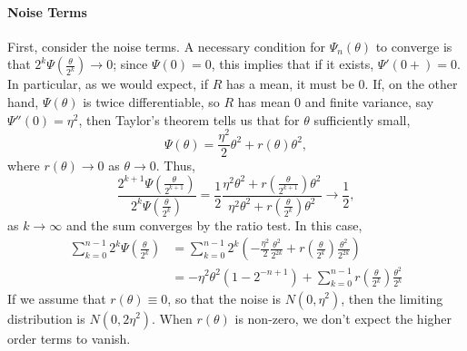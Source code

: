 \documentclass{article}
\newcommand{\1}{\mathbbm{1}}
\theoremstyle{remark}
\theoremstyle{definition}
\begin{document}
\paragraph{Noise Terms}
First, consider the noise terms.  A necessary condition for $\Psi_{n}(\theta)$ to converge is that $2^{k} \Psi\left(\frac{\theta}{2^{k}}\right) \to 0$; since $\Psi(0) = 0$, this implies that if it exists, $\Psi'(0+) = 0$.  In particular, as we would expect, if $R$ has a mean, it must be 0.  If, on the other hand, $\Psi(\theta)$ is twice differentiable, so $R$ has mean 0 and finite variance, say $\Psi''(0) = \eta^{2}$, then Taylor's theorem tells us that for $\theta$ sufficiently small, 
\[
	\Psi(\theta) = \frac{\eta^{2}}{2} \theta^{2} + r(\theta)\theta^{2},
\]
where $r(\theta) \to 0$ as $\theta \to 0$.  Thus,
\begin{equation*}
	\frac{\textstyle 2^{k+1} \Psi\left(\frac{\theta}{2^{k+1}}\right)}{\textstyle 2^{k} \Psi\left(\frac{\theta}{2^{k}}\right)}
	= \frac{1}{2} \frac{\eta^{2} \theta^{2} + {\textstyle  r\left(\frac{\theta}{2^{k+1}}\right)}\theta^{2}}{\eta^{2} \theta^{2} + {\textstyle  r\left(\frac{\theta}{2^{k}}\right)}\theta^{2}}
	\to \frac{1}{2},
\end{equation*}
as $k \to \infty$ and the sum converges by the ratio test.  In this case,
\begin{align*}
	 \sum_{k=0}^{n-1}  {\textstyle 2^{k} \Psi\left(\frac{\theta}{2^{k}}\right)}
	 &=  \sum_{k=0}^{n-1} 2^{k} {\textstyle \left(- \frac{\eta^{2}}{2}  \frac{\theta^{2}}{2^{2k}}
		+ r\left(\frac{\theta}{2^{k}}\right)\frac{\theta^{2}}{2^{2k}}\right)}\\
	&=- \eta^{2} \theta^{2} (1 - 2^{-n+1})  + \sum_{k=0}^{n-1} {\textstyle r\left(\frac{\theta}{2^{k}}\right)\frac{\theta^{2}}{2^{k}}}
\end{align*}
If we assume that $r(\theta) \equiv 0$, so that the noise is $N(0,\eta^{2})$, then the limiting distribution is $N(0,2\eta^{2})$. When  $r(\theta)$ is non-zero, we don't expect the higher order terms to vanish.
\end{document}
